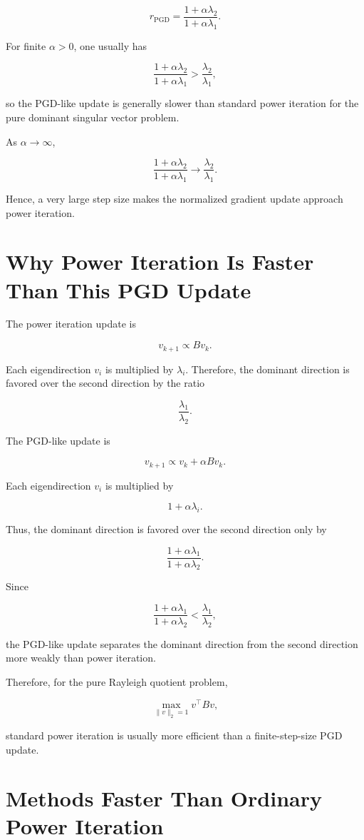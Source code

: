 \documentclass{article}
\begin{document}
\[
r_{\mathrm{PGD}}
=
\frac{1+\alpha\lambda_2}
{1+\alpha\lambda_1}.
\]

For finite \(\alpha>0\), one usually has

\[
\frac{1+\alpha\lambda_2}
{1+\alpha\lambda_1}
>
\frac{\lambda_2}{\lambda_1},
\]

so the PGD-like update is generally slower than standard power iteration for the pure dominant singular vector problem.

As \(\alpha\to\infty\),

\[
\frac{1+\alpha\lambda_2}
{1+\alpha\lambda_1}
\to
\frac{\lambda_2}{\lambda_1}.
\]

Hence, a very large step size makes the normalized gradient update approach power iteration.

\section{Why Power Iteration Is Faster Than This PGD Update}

The power iteration update is

\[
v_{k+1}\propto Bv_k.
\]

Each eigendirection \(v_i\) is multiplied by \(\lambda_i\). Therefore, the dominant direction is favored over the second direction by the ratio

\[
\frac{\lambda_1}{\lambda_2}.
\]

The PGD-like update is

\[
v_{k+1}\propto v_k+\alpha Bv_k.
\]

Each eigendirection \(v_i\) is multiplied by

\[
1+\alpha\lambda_i.
\]

Thus, the dominant direction is favored over the second direction only by

\[
\frac{1+\alpha\lambda_1}
{1+\alpha\lambda_2}.
\]

Since

\[
\frac{1+\alpha\lambda_1}
{1+\alpha\lambda_2}
<
\frac{\lambda_1}{\lambda_2},
\]

the PGD-like update separates the dominant direction from the second direction more weakly than power iteration.

Therefore, for the pure Rayleigh quotient problem,

\[
\max_{\|v\|_2=1}v^\top Bv,
\]

standard power iteration is usually more efficient than a finite-step-size PGD update.

\section{Methods Faster Than Ordinary Power Iteration}
\end{document}
